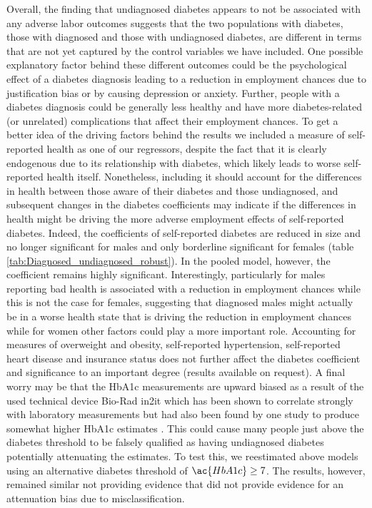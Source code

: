 \documentclass[12pt,english,british]{article}
\begin{document}
Overall, the finding that undiagnosed diabetes appears to not be associated with any adverse labor outcomes suggests that the two populations with diabetes, those with diagnosed and those with undiagnosed diabetes, are different in terms that are not yet captured by the control variables we have included. One possible explanatory factor behind these different outcomes could be the psychological effect of a diabetes diagnosis leading to a reduction in employment chances due to justification bias or by causing depression or anxiety. Further, people with a diabetes diagnosis could be generally less healthy and have more diabetes-related (or unrelated) complications that affect their employment chances. To get a better idea of the driving factors behind the results we included a measure of self-reported health as one of our regressors, despite the fact that it is clearly endogenous due to its relationship with diabetes, which likely leads to worse self-reported health itself. Nonetheless, including it should account for the differences in health between those aware of their diabetes and those undiagnosed, and subsequent changes in the diabetes coefficients may indicate if the differences in health might be driving the more adverse employment effects of self-reported diabetes. Indeed, the coefficients of self-reported diabetes are reduced in size and no longer significant for males and only borderline significant for females (table \ref{tab:Diagnosed_undiagnosed_robust}). In the pooled model, however, the coefficient remains highly significant. Interestingly, particularly for males reporting bad health is associated with a reduction in employment chances while this is not the case for females, suggesting that diagnosed males might actually be in a worse health state that is driving the reduction in employment chances while for women other factors could play a more important role. Accounting for measures of overweight and obesity, self-reported hypertension, self-reported heart disease and insurance status does not further  affect the diabetes coefficient and significance to an important degree (results available on request). A final worry may be that the \ac{HbA1c} measurements are upward biased as a result of the used technical device Bio-Rad in2it which has been shown to correlate strongly with laboratory measurements \citep{HealthQualityOntario2014} but had also been found by one study to produce somewhat higher \ac{HbA1c} estimates \citep{Yeo2009}. This could cause many people just above the diabetes threshold to be falsely qualified as having undiagnosed diabetes potentially attenuating the estimates. To test this, we reestimated above models using an alternative diabetes threshold of $\ac{HbA1c} \geq 7$. The results, however, remained similar not providing evidence that did not provide evidence for an attenuation bias due to misclassification.
\end{document}
